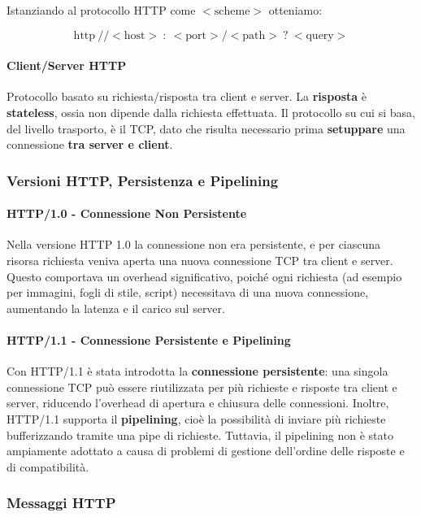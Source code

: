 \documentclass{article}
\begin{document}
Istanziando al protocollo HTTP come $<\text{scheme}>$ otteniamo:

\[ \boxed{\text{http}\: // <\text{host}> \::\: <\text{port}>/<\text{path}> \:?\: <\text{query}>} \]

\paragraph{Client/Server HTTP} Protocollo basato su richiesta/risposta tra client e server. La \textbf{risposta} è \textbf{stateless}, ossia non dipende dalla richiesta effettuata.
Il protocollo su cui si basa, del livello trasporto, è il TCP, dato che risulta necessario prima \textbf{setuppare} una connessione \textbf{tra server e client}.

\subsubsection{Versioni HTTP, Persistenza e Pipelining}

\paragraph{HTTP/1.0 - Connessione Non Persistente}
Nella versione HTTP 1.0 la connessione non era persistente, e per ciascuna risorsa richiesta veniva aperta una nuova connessione TCP tra client e server. Questo comportava un overhead significativo, poiché ogni richiesta (ad esempio per immagini, fogli di stile, script) necessitava di una nuova connessione, aumentando la latenza e il carico sul server.

\paragraph{HTTP/1.1 - Connessione Persistente e Pipelining}
Con HTTP/1.1 è stata introdotta la \textbf{connessione persistente}: una singola connessione TCP può essere riutilizzata per più richieste e risposte tra client e server, 
riducendo l'overhead di apertura e chiusura delle connessioni. Inoltre, HTTP/1.1 supporta il \textbf{pipelining}, cioè la possibilità di inviare più richieste bufferizzando tramite una pipe di richieste.
Tuttavia, il pipelining non è stato ampiamente adottato a causa di problemi di gestione dell'ordine delle risposte e di compatibilità.

\newpage

\subsubsection{Messaggi HTTP}
\end{document}
